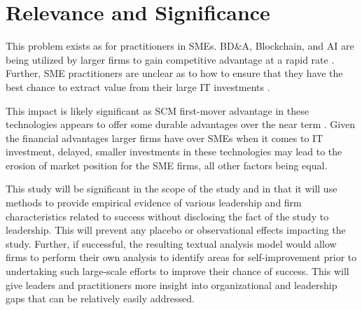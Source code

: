 \section{Relevance and Significance}

This problem exists as for practitioners in SMEs. BD\&A, Blockchain, and AI are being utilized by larger firms to gain competitive advantage at a rapid rate \parencite{willettsBarriersSMEsAdoption2020,alazabBlockchainTechnologySupply2021}. Further, SME practitioners are unclear as to how to ensure that they have the best chance to extract value from their large IT investments \parencite{walshEnterpriseSystemInvestments2010}.

This impact is likely significant as SCM first-mover advantage in these technologies appears to offer some durable advantages over the near term \parencite{chenHowUseBig2015}. Given the financial advantages larger firms have over SMEs when it comes to IT investment, delayed, smaller investments in these technologies may lead to the erosion of market position for the SME firms, all other factors being equal.

This study will be significant in the scope of the study and in that it will use methods to provide empirical evidence of various leadership and firm characteristics related to success without disclosing the fact of the study to leadership. This will prevent any placebo or observational effects impacting the study. Further, if successful, the resulting textual analysis model would allow firms to perform their own analysis to identify areas for self-improvement prior to undertaking such large-scale efforts to improve their chance of success. This will give leaders and practitioners more insight into organizational and leadership gaps that can be relatively easily addressed.
